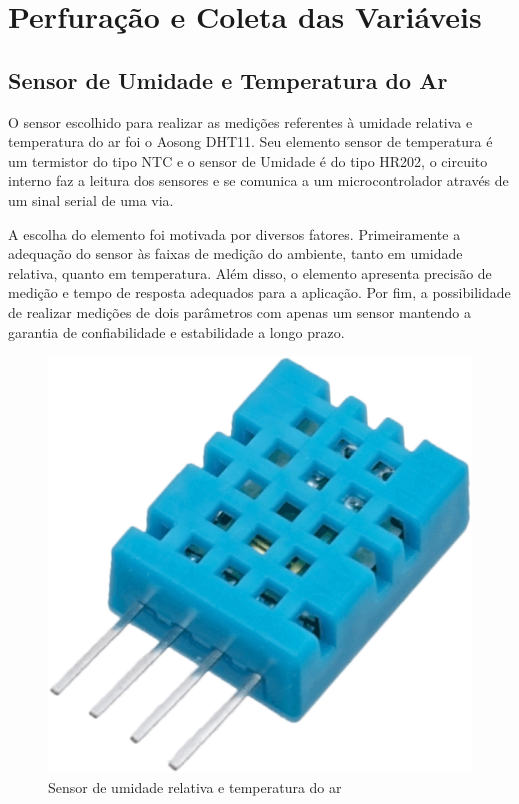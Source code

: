  

  \section{Perfuração e Coleta das Variáveis}

  \subsection{Sensor de Umidade e Temperatura do Ar}

  O sensor escolhido para realizar as medições referentes à umidade relativa e
  temperatura do ar foi o Aosong DHT11. Seu elemento sensor de temperatura é um
  termistor do tipo NTC e o sensor de Umidade é do tipo HR202, o circuito interno
  faz a leitura dos sensores e se comunica a um microcontrolador através de um
  sinal serial de uma via.%
 
  A escolha do elemento foi motivada por diversos fatores. Primeiramente a
  adequação do sensor às faixas de medição do ambiente, tanto em umidade
  relativa, quanto em temperatura. Além disso, o elemento apresenta precisão de
  medição e tempo de resposta adequados para a aplicação.  Por fim, a
  possibilidade de realizar medições de dois parâmetros com apenas um sensor
  mantendo a garantia de confiabilidade e estabilidade a longo prazo. 

  \begin{figure}[!htbp]
  \begin{center}
  \includegraphics[keepaspectratio=true,scale=0.1]{figuras/dht-11.eps}
  \caption{\label{DHT11}Sensor de umidade relativa e temperatura do ar}
  \end{center}
  \end{figure}
 

